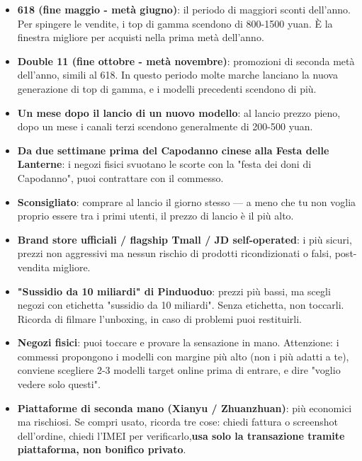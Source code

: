 \begin{itemize}
  \item \textbf{618 (fine maggio - metà giugno)}: il periodo di maggiori sconti dell'anno. Per spingere le vendite, i top di gamma scendono di 800-1500 yuan. È la finestra migliore per acquisti nella prima metà dell'anno.
  \item \textbf{Double 11 (fine ottobre - metà novembre)}: promozioni di seconda metà dell'anno, simili al 618. In questo periodo molte marche lanciano la nuova generazione di top di gamma, e i modelli precedenti scendono di più.
  \item \textbf{Un mese dopo il lancio di un nuovo modello}: al lancio prezzo pieno, dopo un mese i canali terzi scendono generalmente di 200-500 yuan.
  \item \textbf{Da due settimane prima del Capodanno cinese alla Festa delle Lanterne}: i negozi fisici svuotano le scorte con la "festa dei doni di Capodanno", puoi contrattare con il commesso.
  \item \textbf{Sconsigliato}: comprare al lancio il giorno stesso — a meno che tu non voglia proprio essere tra i primi utenti, il prezzo di lancio è il più alto.
\end{itemize}


\begin{itemize}
  \item \textbf{Brand store ufficiali / flagship Tmall / JD self-operated}: i più sicuri, prezzi non aggressivi ma nessun rischio di prodotti ricondizionati o falsi, post-vendita migliore.
  \item \textbf{"Sussidio da 10 miliardi" di Pinduoduo}: prezzi più bassi, ma scegli negozi con etichetta "sussidio da 10 miliardi". Senza etichetta, non toccarli. Ricorda di filmare l'unboxing, in caso di problemi puoi restituirli.
  \item \textbf{Negozi fisici}: puoi toccare e provare la sensazione in mano. Attenzione: i commessi propongono i modelli con margine più alto (non i più adatti a te), conviene scegliere 2-3 modelli target online prima di entrare, e dire "voglio vedere solo questi".
  \item \textbf{Piattaforme di seconda mano (Xianyu / Zhuanzhuan)}: più economici ma rischiosi. Se compri usato, ricorda tre cose: chiedi fattura o screenshot dell'ordine, chiedi l'IMEI per verificarlo,\textbf{usa solo la transazione tramite piattaforma, non bonifico privato}.
\end{itemize}

